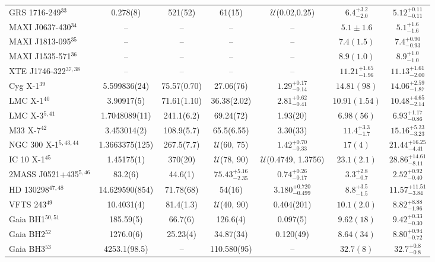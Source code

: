 \begin{table}[h]
\begin{threeparttable}
{\begin{tabular}{|l c c c c c c|}
GRS 1716-249$^{33}$ & 0.278(8) & 521(52) & 61(15)  &$\mathcal{U}$(0.02,0.25)& $6.4^{+3.2}_{-2.0}$  & $5.12_{-0.11}^{+0.11}$\\ 
MAXI J0637-430$^{34}$ & -- & -- & --&--& $5.1\pm1.6$ & $5.1_{-1.6}^{+1.6}$\\ 
MAXI J1813-095$^{35}$ & -- & -- & --  &--& $7.4(1.5)$ & $7.4_{-0.93}^{+0.90}$\\ 
MAXI J1535-571$^{36}$ & -- & -- & --   &--& $8.9(1.0)$ & $8.9_{-1.0}^{+1.0}$\\ 
XTE J1746-322$^{37,38}$ & -- & -- & --   &--& $11.21^{+1.65}_{-1.96}$ & $11.13_{-2.00}^{+1.61}$ \\ 
Cyg X-1$^{39}$ & 5.599836(24) & 75.57(0.70) & 27.06(76) & $1.29^{+0.17}_{-0.14}$ &$14.81(98)$ & $14.06_{-1.87}^{+2.59}$ \\ 
LMC X-1$^{40}$ & 3.90917(5) & 71.61(1.10) & 36.38(2.02) & $2.81^{+0.62}_{-0.41}$& $10.91(1.54)$ & $10.48_{-2.14}^{+4.65}$ \\ 
LMC X-3$^{5,41}$ & 1.7048089(11) & 241.1(6.2) & 69.24(72) & 1.93(20)& $6.98(56)$ & $6.93_{-0.86}^{+1.17}$\\ 
M33 X-7$^{42}$ & 3.453014(2) & 108.9(5.7) & 65.5(6.55) & 3.30(33)& $11.4^{+3.3}_{-1.7}$ & $15.16_{-3.23}^{+5.23}$ \\ 
NGC 300 X-1$^{5,43,44}$ & 1.3663375(125) & 267.5(7.7) & $\mathcal{U}$(60, 75) & $1.42^{+0.70}_{-0.33}$ & $17(4)$ & $21.44_{-4.41}^{+16.25}$ \\ 
IC 10 X-1$^{45}$ & 1.45175(1) & 370(20) & $\mathcal{U}$(78, 90) & $\mathcal{U}$(0.4749, 1.3756) & $23.1(2.1)$ & $28.86_{-8.11}^{+14.61}$  \\ 
2MASS J0521+435$^{5,46}$ & 83.2(6) & 44.6(1) & $75.43^{+5.16}_{-2.35}$& $0.74^{+0.26}_{-0.17}$ & $3.3^{+2.8}_{-0.7}$ & $2.52_{-0.40}^{+0.92}$\\ 
HD 130298$^{47, 48}$ & 14.629590(854) & 71.78(68) & 54(16) & $3.180^{+0.720}_{-0.499}$ & $8.8^{+3.5}_{-1.5}$ & $11.57_{-3.84}^{+11.51}$\\ 
VFTS 243$^{49}$ & 10.4031(4) & 81.4(1.3) & $\mathcal{U}$(40, 90) & 0.404(201)& $10.1(2.0)$ & $8.82^{+8.88}_{-1.96}$ \\ 
Gaia BH1$^{50,51}$ & 185.59(5) & 66.7(6) & 126.6(4) & 0.097(5) & $9.62(18)$ & $9.42_{-0.30}^{+0.33}$ \\ 
Gaia BH2$^{52}$ & 1276.0(6) & 25.23(4) & 34.87(34) & 0.120(49) & $8.64(34)$ & $8.80_{-0.72}^{+0.94}$\\
Gaia BH3$^{53}$ & 4253.1(98.5) & -- & 110.580(95)  & -- & $32.7(8)$ & $32.7_{-0.8}^{+0.8}$\\ 

\end{tabular}}
\end{threeparttable}
\end{table}
